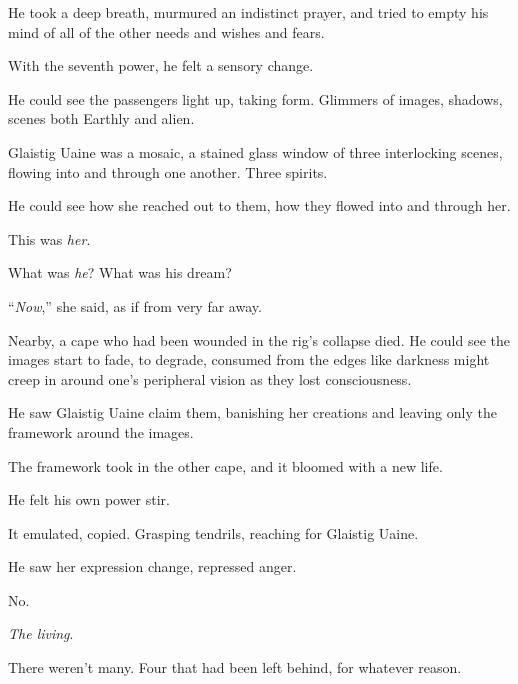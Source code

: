 He took a deep breath, murmured an indistinct prayer, and tried to empty his mind of all of the other needs and wishes and fears.



With the seventh power, he felt a sensory change.



He could see the passengers light up, taking form.  Glimmers of images, shadows, scenes both Earthly and alien.



Glaistig Uaine was a mosaic, a stained glass window of three interlocking scenes, flowing into and through one another.  Three spirits.



He could see how she reached out to them, how they flowed into and through her.



This was \emph{her}.



What was \emph{he}?  What was his dream?



``\emph{Now},'' she said, as if from very far away.



Nearby, a cape who had been wounded in the rig's collapse died.  He could see the images start to fade, to degrade, consumed from the edges like darkness might creep in around one's peripheral vision as they lost consciousness.



He saw Glaistig Uaine claim them, banishing her creations and leaving only the framework around the images.



The framework took in the other cape, and it bloomed with a new life.



He felt his own power stir.



It emulated, copied.  Grasping tendrils, reaching for Glaistig Uaine.



He saw her expression change, repressed anger.



No.



\emph{The living}.



There weren't many.  Four that had been left behind, for whatever reason.




